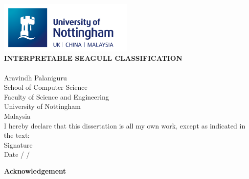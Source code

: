\documentclass[a4paper,12pt]{report}
\begin{document}
\newpage
\begin{titlepage}
    \begin{center}
        \vspace{0.1em}
        \includegraphics[width=0.5\textwidth]{images/nottingham_logo.png}\\[6em]

        \textbf{INTERPRETABLE SEAGULL CLASSIFICATION}\\[6em]

        \\[4em]

        Aravindh Palaniguru\\
        School of Computer Science\\
        Faculty of Science and Engineering\\
        University of Nottingham\\
        Malaysia\\[6em]

        I hereby declare that this dissertation is all my own work, except as indicated in the text:\\[4em]

        Signature \underline{\hspace{7cm}}\\[2em]
        Date \hspace{1cm} \underline{\hspace{1cm}} / \underline{\hspace{1cm}} / \underline{\hspace{2cm}}
    \end{center}
\end{titlepage}



\newpage
\begin{center}
    \textbf{Acknowledgement}
\end{center}
\end{document}
